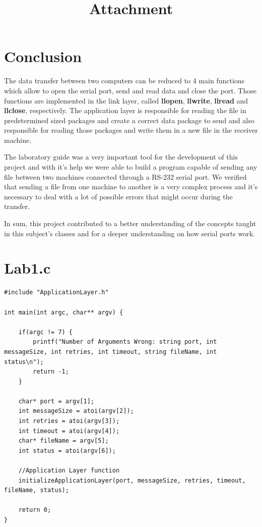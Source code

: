 \documentclass[a4paper]{article}
\begin{document}
\section{Conclusion}
The data transfer between two computers can be reduced to 4 main functions which allow to open the serial port, send and read data and close the port. Those functions are implemented in the link layer, called \textbf{llopen}, \textbf{llwrite}, \textbf{llread} and \textbf{llclose}, respectively. The application layer is responsible for reading the file in predetermined sized packages and create a correct data package to send and also responsible for reading those packages and write them in a new file in the receiver machine.

The laboratory guide was a very important tool for the development of this project and with it's help we were able to build a program capable of sending any file between two machines connected through a RS-232 serial port. We verified that sending a file from one machine to another is a very complex process and it's necessary to deal with a lot of possible errors that might occur during the transfer. 

In sum, this project contributed to a better understanding of the concepts taught in this subject's classes and for a deeper understanding on how serial ports work.

\newpage
\clearpage
\vspace*{\fill}
\begin{center}
\begin{minipage}{0.5\textwidth}
\title{\Huge\textbf{Attachment}}
\end{minipage}
\end{center}
\vfill %
\clearpage
\newpage

\section{Lab1.c}
\begin{lstlisting}
#include "ApplicationLayer.h"

int main(int argc, char** argv) {

    if(argc != 7) {
        printf("Number of Arguments Wrong: string port, int messageSize, int retries, int timeout, string fileName, int status\n");
        return -1;
    }
	
    char* port = argv[1];
    int messageSize = atoi(argv[2]);
    int retries = atoi(argv[3]);
    int timeout = atoi(argv[4]);
    char* fileName = argv[5];
    int status = atoi(argv[6]);

    //Application Layer function
    initializeApplicationLayer(port, messageSize, retries, timeout, fileName, status);

    return 0;
}
\end{lstlisting}
\newpage
\end{document}
